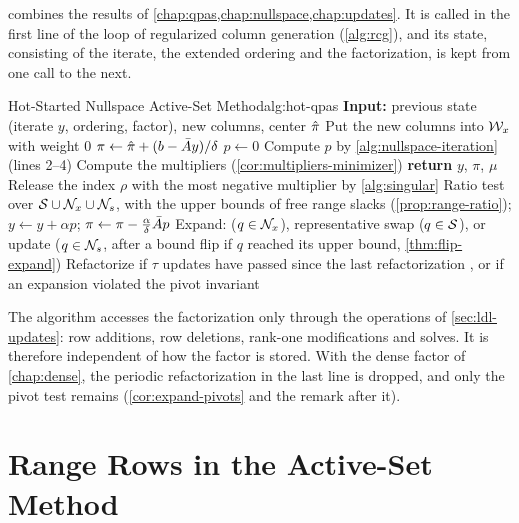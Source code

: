  combines the results of
\cref{chap:qpas,chap:nullspace,chap:updates}. It is called in the first line of the loop of
regularized column generation (\cref{alg:rcg}), and its state, consisting of the iterate, the
extended ordering and the factorization, is kept from one call to the next.

\begin{algobox}{Hot-Started Nullspace Active-Set Method}{alg:hot-qpas}
\State \textbf{Input:} previous state (iterate $y$, ordering, factor), new columns, center $\hat{\pi}$
\State Put the new columns into $\mathcal{W}_x$ with weight $0$ 
\State $\pi\gets\hat{\pi} + (b - \bar{A} y)/\delta$
\Repeat
        \State $p\gets0$ 
    \Else
        \State Compute $p$ by \cref{alg:nullspace-iteration} (lines 2--4)
    \EndIf
        \State Compute the multipliers (\cref{cor:multipliers-minimizer})
         \textbf{return} $y$, $\pi$, $\mu$ \EndIf
        \State Release the index $\rho$ with the most negative multiplier by \cref{alg:singular}
    \Else
        \State Ratio test over $\mathcal{S}\cup\mathcal{N}_x\cup\mathcal{N}_s$, with the upper bounds of free range
               slacks (\cref{prop:range-ratio}); $y\gets y + \alpha p$;
               $\pi\gets\pi - \frac{\alpha}{\delta}\bar{A} p$
            \State Expand:  ($q\in\mathcal{N}_x$), representative swap ($q\in\mathcal{S}$), or
                   update ($q\in\mathcal{N}_s$, after a bound flip if $q$ reached its upper bound,
                   \cref{thm:flip-expand})
        \EndIf
    \EndIf
    \State Refactorize if $\tau$ updates have passed since the last refactorization
           , or if an expansion violated the pivot invariant
\end{algobox}

The algorithm accesses the factorization only through the operations of
\cref{sec:ldl-updates}: row additions, row deletions, rank-one modifications and solves. It is
therefore independent of how the factor is stored. With the dense factor of
\cref{chap:dense}, the periodic refactorization in the last line is dropped, and only the
pivot test remains (\cref{cor:expand-pivots} and the remark after it).


\section{Range Rows in the Active-Set Method}
\label{sec:range-qpas}

